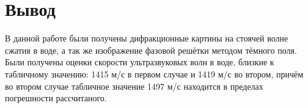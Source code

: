 \documentclass[12pt, a4paper]{article}
\begin{document}
\section*{Вывод}
В данной работе были получены дифракционные картины на стоячей волне сжатия в воде, а так же
изображение фазовой решётки методом тёмного поля. Были получены оценки скорости ультразвуковых волн
в воде, близкие к табличному значению: 1415 м/с в первом случае и 1419 м/с во втором, причём во втором случае табличное значение 1497 м/с находится в пределах погрешности рассчитаного.
\end{document}
